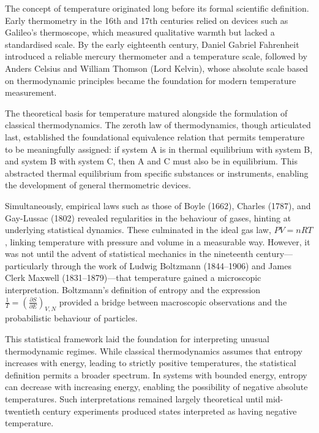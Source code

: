 \begin{historical}
The concept of temperature originated long before its formal scientific definition. Early thermometry in the 16th and 17th centuries relied on devices such as Galileo’s thermoscope, which measured qualitative warmth but lacked a standardised scale. By the early eighteenth century, Daniel Gabriel Fahrenheit introduced a reliable mercury thermometer and a temperature scale, followed by Anders Celsius and William Thomson (Lord Kelvin), whose absolute scale based on thermodynamic principles became the foundation for modern temperature measurement.

The theoretical basis for temperature matured alongside the formulation of classical thermodynamics. The zeroth law of thermodynamics, though articulated last, established the foundational equivalence relation that permits temperature to be meaningfully assigned: if system A is in thermal equilibrium with system B, and system B with system C, then A and C must also be in equilibrium. This abstracted thermal equilibrium from specific substances or instruments, enabling the development of general thermometric devices.

Simultaneously, empirical laws such as those of Boyle (1662), Charles (1787), and Gay-Lussac (1802) revealed regularities in the behaviour of gases, hinting at underlying statistical dynamics. These culminated in the ideal gas law, \( PV = nRT \), linking temperature with pressure and volume in a measurable way. However, it was not until the advent of statistical mechanics in the nineteenth century—particularly through the work of Ludwig Boltzmann (1844–1906) and James Clerk Maxwell (1831–1879)—that temperature gained a microscopic interpretation. Boltzmann’s definition of entropy and the expression \( \frac{1}{T} = \left(\frac{\partial S}{\partial E}\right)_{V,N} \) provided a bridge between macroscopic observations and the probabilistic behaviour of particles.

This statistical framework laid the foundation for interpreting unusual thermodynamic regimes. While classical thermodynamics assumes that entropy increases with energy, leading to strictly positive temperatures, the statistical definition permits a broader spectrum. In systems with bounded energy, entropy can decrease with increasing energy, enabling the possibility of negative absolute temperatures. Such interpretations remained largely theoretical until mid-twentieth century experiments produced states interpreted as having negative temperature. 
\end{historical}
